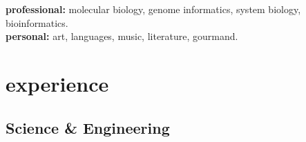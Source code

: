 \documentclass[]{friggeri-cv} %
\begin{document}
\textbf{professional:} molecular biology, genome informatics, system biology, bioinformatics. \\
\textbf{personal:} art, languages, music, literature, gourmand. \\


\section{experience}

\subsection{Science \& Engineering}
\end{document}
